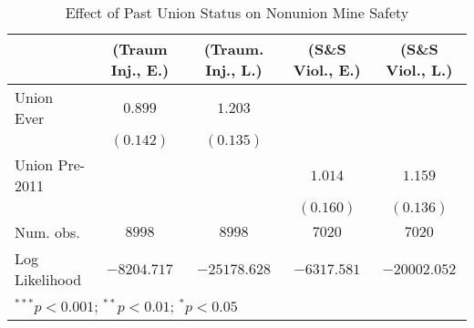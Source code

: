 
\begin{table}
\begin{center}
\begin{tabular}{l c c c c}
\hline
 & (Traum Inj., E.) & (Traum. Inj., L.) & (S\&S Viol., E.) & (S\&S Viol., L.) \\
\hline
Union Ever     & $0.899$     & $1.203$      &             &              \\
               & $(0.142)$   & $(0.135)$    &             &              \\
Union Pre-2011 &             &              & $1.014$     & $1.159$      \\
               &             &              & $(0.160)$   & $(0.136)$    \\
\hline
Num. obs.      & $8998$      & $8998$       & $7020$      & $7020$       \\
Log Likelihood & $-8204.717$ & $-25178.628$ & $-6317.581$ & $-20002.052$ \\
\hline
\multicolumn{5}{l}{\scriptsize{$^{***}p<0.001$; $^{**}p<0.01$; $^{*}p<0.05$}}
\end{tabular}
\caption{Effect of Past Union Status on Nonunion Mine Safety}
\label{irr_100employees_union_inertia}
\end{center}
\end{table}

